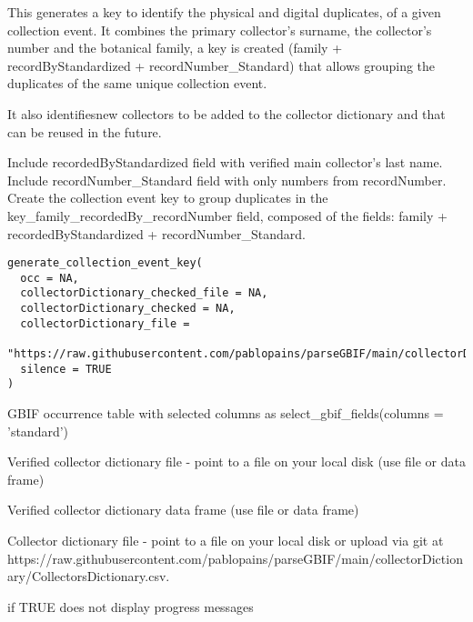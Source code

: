 \documentclass[a4paper]{book}
\begin{document}
%
\begin{Description}
This generates a key to identify the physical and digital duplicates, of a given collection event.
It combines the primary collector's surname, the collector's number and the botanical family, a key is created
(family + recordByStandardized + recordNumber\_Standard) that allows grouping the duplicates of the same unique
collection event.

It also identifiesnew collectors to be added to the collector dictionary and that can be reused in the future.

Include recordedByStandardized field with verified main collector's last name.
Include recordNumber\_Standard field with only numbers from recordNumber.
Create the collection event key to group duplicates in the key\_family\_recordedBy\_recordNumber field,
composed of the fields: family + recordedByStandardized + recordNumber\_Standard.
\end{Description}
%
\begin{Usage}
\begin{verbatim}
generate_collection_event_key(
  occ = NA,
  collectorDictionary_checked_file = NA,
  collectorDictionary_checked = NA,
  collectorDictionary_file =
    "https://raw.githubusercontent.com/pablopains/parseGBIF/main/collectorDictionary/CollectorsDictionary.csv",
  silence = TRUE
)
\end{verbatim}
\end{Usage}
%
\begin{Arguments}
\begin{ldescription}
\item[\code{occ}] GBIF occurrence table with selected columns as select\_gbif\_fields(columns = 'standard')

\item[\code{collectorDictionary\_checked\_file}] Verified collector dictionary file - point to a file on your local disk (use file or data frame)

\item[\code{collectorDictionary\_checked}] Verified collector dictionary data frame (use file or data frame)

\item[\code{collectorDictionary\_file}] Collector dictionary file - point to a file on your local disk or upload via git at https://raw.githubusercontent.com/pablopains/parseGBIF/main/collectorDictionary/CollectorsDictionary.csv.

\item[\code{silence}] if TRUE does not display progress messages
\end{ldescription}
\end{Arguments}
\end{document}
